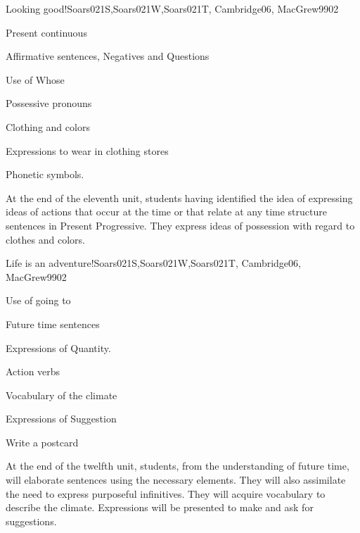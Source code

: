 \begin{syllabus}
\begin{unit}{Looking good!}{}{Soars021S,Soars021W,Soars021T, Cambridge06, MacGrew99}{0}{2}
   \begin{topics}
      \item Present continuous
      \item Affirmative sentences, Negatives and Questions 
      \item Use of Whose
      \item Possessive pronouns
      \item Clothing and colors
      \item Expressions to wear in clothing stores
      \item Phonetic symbols.
   \end{topics}

   \begin{learningoutcomes}
      \item At the end of the eleventh unit, students having identified the idea of expressing ideas of actions that occur at the time or that relate at any time structure sentences in Present Progressive. They express ideas of possession with regard to clothes and colors.
   \end{learningoutcomes}

\end{unit}

\begin{unit}{Life is an adventure!}{}{Soars021S,Soars021W,Soars021T, Cambridge06, MacGrew99}{0}{2}
   \begin{topics}
      \item Use of going to
      \item Future time sentences
      \item Expressions of Quantity.
      \item Action verbs
      \item Vocabulary of the climate
      \item Expressions of Suggestion
      \item Write a postcard
   \end{topics}
   \begin{learningoutcomes}
      \item At the end of the twelfth unit, students, from the understanding of future time, will elaborate sentences using the necessary elements. They will also assimilate the need to express purposeful infinitives. They will acquire vocabulary to describe the climate. Expressions will be presented to make and ask for suggestions.
   \end{learningoutcomes}
\end{unit}


\end{syllabus}
